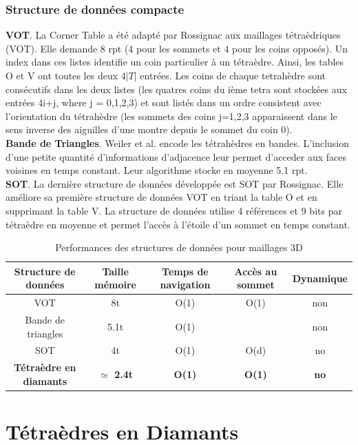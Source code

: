 \documentclass[a4paper,11pt,openany]{article}
\begin{document}
\subsubsection{Structure de données compacte}
\noindent
\textbf{VOT}. La Corner Table a été adapté par Rossignac aux maillages tétraèdriques (VOT). Elle demande 8 rpt (4 pour les sommets et 4 pour les coins opposés). Un index dans ces listes identifie un coin particulier à un tétraèdre. Ainsi, les tables O et V ont toutes les deux $4|T|$ entrées. Les coins de chaque tetrahèdre sont consécutifs dans les deux listes (les quatres coins du ième tetra sont stockées aux entrées  4i+j, where j = 0,1,2,3) et sont listés dans un ordre consistent avec l'orientation du tétrahèdre (les sommets des coins j=1,2,3 apparaissent dans le sens inverse des aiguilles d'une montre depuis le sommet du coin 0).\\
\textbf{Bande de Triangles}. Weiler et al. \cite{triangle_strips_weiler} encode les tétrahèdres en bandes. L'inclusion d'une petite quantité d'informations d'adjacence leur permet d'acceder aux faces voisines en temps constant. Leur algorithme stocke en moyenne 5.1 rpt.\\
\textbf{SOT}. La dernière structure de données développée est SOT \cite{SOT} par Rossignac. Elle améliore sa première structure de données VOT en triant la table O et en supprimant la table V. La structure de données utilise 4 références et 9 bits par tétraèdre en moyenne et permet l'accès à l'étoile d'un sommet en temps constant.

\begin{table}[H]
\footnotesize
\begin{tabular}{|c | c | c | c | c|}
\hline
Structure de données & Taille mémoire & Temps de navigation & Accès au sommet & Dynamique\\
\hline
VOT & 8t & O(1) & O(1) & non \\
Bande de triangles \cite{triangle_strips_weiler} & 5.1t & O(1) &  & non \\
SOT \cite{SOT} & 4t & O(1) & O(d)  & no\\
\textbf{Tétraèdre en diamants} & \textbf{$\simeq$ 2.4t} & \textbf{O(1)} & \textbf{O(1)} & \textbf{no} \\
\hline  
\end{tabular}
\caption{Performances des structures de données pour maillages 3D}
\end{table}

\section{Tétraèdres en Diamants}
\end{document}

